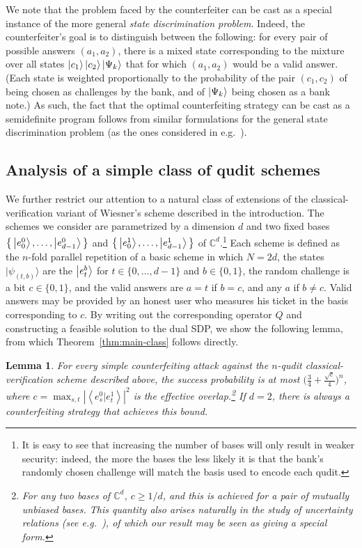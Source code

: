 \documentclass[11pt,letterpaper]{article}
\newtheorem{lemma}[theorem]{Lemma}
\theoremstyle{definition}
\newcommand{\microspace}{\mspace{0.5mu}}
\def\complex{\mathbb{C}}
\def \lket {\left|}
\def \rket {\right\rangle}
\newcommand{\ket}[1]{\lket\microspace #1 \microspace\rket}
\begin{document}
We note that the problem faced by the counterfeiter can be cast as
a special instance of the more general \emph{state discrimination problem}.
Indeed, the counterfeiter's goal is to distinguish between the following: for every
pair of possible answers $(a_1,a_2)$, there is a mixed state corresponding
to the mixture over all states $\ket{c_1}\ket{c_2}\ket{\Psi_k}$
that for which $(a_1,a_2)$ would be a valid answer.
(Each state is weighted proportionally to the probability of the pair $(c_1,c_2)$
of being chosen as challenges by the bank, and of $\ket{\Psi_k}$ being chosen
as a bank note.) 
 As such, the fact that the optimal
counterfeiting strategy can be cast as a semidefinite program follows from
similar formulations for the general state discrimination problem (as the ones considered
in e.g.~\cite{EldarMV03}).

\subsection{Analysis of a simple class of qudit schemes}
\label{sec:simple-classical-ver}

We further restrict our attention to a natural class of extensions of
the classical-verification variant of Wiesner's scheme described in
the introduction. The schemes we consider are parametrized by a
dimension $d$ and two fixed bases
$\big\{\ket{e_0^0},\ldots,\ket{e_{d-1}^0}\big\}$ and
$\big\{\ket{e_0^1},\ldots,\ket{e_{d-1}^1}\big\}$ of $\complex^d$.\footnote{
It is easy to see that increasing the number of bases will only result
in weaker security: indeed, the more the bases the less likely it is
that the bank's randomly chosen challenge will match the basis used to 
encode each qudit.}
Each scheme is defined as the $n$-fold parallel repetition of a basic
scheme in which $N = 2d$, the states $|\psi_{(t,b)}\rangle$ are the
$\ket{e_t^b}$ for $t\in \{0,\ldots,d-1\}$ and $b\in\{0,1\}$, the random challenge
is a bit $c\in\{0,1\}$, and the valid answers are $a=t$ if $b=c$, and
any $a$ if $b\neq c$. Valid answers may be provided by an honest user
who measures his ticket in the basis corresponding to $c$. By writing
out the corresponding operator $Q$ and constructing a feasible
solution to the dual SDP, we show the following lemma, from which
Theorem~\ref{thm:main-class} follows directly. 

\begin{lemma}\label{lem:optdual-class} 
  For every simple counterfeiting attack against the $n$-qudit
  classical-verification scheme described above, the success
  probability is at most $\big(\frac{3}{4}+ \frac{\sqrt{c}}{4}\big)^n$,
  where $c = \max_{s,t} \left| \left\langle e_s^0|e_{t}^1
  \right\rangle\right|^2$
  is the \emph{effective overlap}.\footnote{%
    For any two bases of $\complex^d$,
    $c\geq 1/d$,
    and this is achieved for a pair of mutually unbiased bases. 
    This quantity also arises naturally in the study of uncertainty
    relations (see e.g.~\cite{TomR11}), of which our result may be
    seen as giving a special form.}
  \linebreak
  If $d=2$, there is always a counterfeiting strategy that
  achieves this bound.
\end{lemma}
\end{document}
